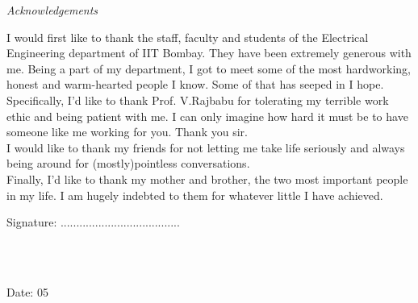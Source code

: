 \documentclass[12pt, a4paper, oneside]{book}
\begin{document}
\newcommand{\acknowledgements}{

\thispagestyle{plain}

\begin{center}{\huge{\textit{Acknowledgements}} \par}\end{center}

\vspace*{15px}


\noindent I would first like to thank the staff, faculty and students of the Electrical Engineering department of IIT Bombay. They have been extremely generous with me. Being a part of my department, I got to meet some of the most hardworking, honest and warm-hearted people I know. Some of that has seeped in I hope. \\
Specifically, I'd like to thank Prof. V.Rajbabu for tolerating my terrible work ethic and being patient with me. I can only imagine how hard it must be to have someone like me working for you. Thank you sir. \\
I would like to thank my friends for not letting me take life seriously and always being around for (mostly)pointless conversations. \\
Finally, I'd like to thank my mother and brother, the two most important people in my life. I am hugely indebted to them for whatever little I have achieved. 

\vspace*{15px}

\begin{flushright}
{Signature: ......................................\\[0.4cm]}

{\textbf{\authorName}\\[0.0cm]\rollNo\\[2.0cm]}
\end{flushright}

\begin{flushleft}
{Date:} 05 \currentmonth { } \currentyear\\
\end{flushleft}
}






\label{Bibliography}



\clearpage



\clearpage

\acknowledgements
\end{document}
